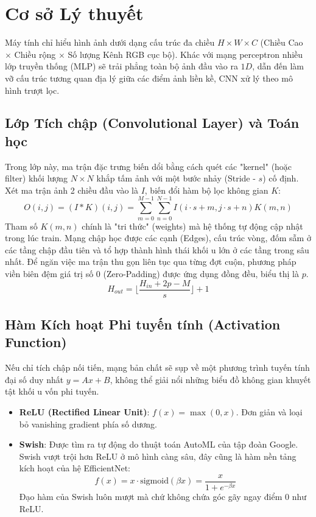 \documentclass[conference,a4paper]{IEEEtran}
\begin{document}
\section{Cơ sở Lý thuyết}
Máy tính chỉ hiểu hình ảnh dưới dạng cấu trúc đa chiều $H \times W \times C$ (Chiều Cao $\times$ Chiều rộng $\times$ Số lượng Kênh RGB cục bộ). Khác với mạng perceptron nhiều lớp truyền thống (MLP) sẽ trải phẳng toàn bộ ảnh đầu vào ra $1D$, dẫn đến làm vỡ cấu trúc tương quan địa lý giữa các điểm ảnh liền kề, CNN xử lý theo mô hình trượt lọc.

\subsection{Lớp Tích chập (Convolutional Layer) và Toán học}
Trong lớp này, ma trận đặc trưng biến dổi bằng cách quét các "kernel" (hoặc filter) khối lượng $N \times N$ khắp tấm ảnh với một bước nhảy (Stride - $s$) cố định.
Xét ma trận ảnh 2 chiều đầu vào là $I$, biến đổi hàm bộ lọc không gian $K$:
\begin{equation}
O(i, j) = (I * K)(i, j) = \sum_{m=0}^{M-1} \sum_{n=0}^{N-1} I(i \cdot s + m, j \cdot s + n) K(m, n)
\end{equation}
Tham số $K(m,n)$ chính là "tri thức" (weights) mà hệ thống tự động cập nhật trong lúc train. Mạng chập học được các cạnh (Edges), cấu trúc vòng, đốm sẫm ở các tầng chập đầu tiên và tổ hợp thành hình thái khối u lớn ở các tầng trong sâu nhất.
Để ngăn việc ma trận thu gọn liên tục qua từng đợt cuộn, phương pháp viền biên đệm giá trị số 0 (Zero-Padding) được ứng dụng đồng đều, biểu thị là $p$.
\begin{equation}
H_{out} = \lfloor \frac{H_{in} + 2p - M}{s} \rfloor + 1
\end{equation}

\subsection{Hàm Kích hoạt Phi tuyến tính (Activation Function)}
Nếu chỉ tích chập nối tiến, mạng bản chất sẽ sụp về một phương trình tuyến tính đại số duy nhất $y = Ax+B$, không thể giải nổi những biểu đồ không gian khuyết tật khối u vốn phi tuyến.
\begin{itemize}
\item \textbf{ReLU (Rectified Linear Unit)}: $f(x) = \max(0, x)$. Đơn giản và loại bỏ vanishing gradient phía số dương.
\item \textbf{Swish}: Được tìm ra tự động do thuật toán AutoML của tập đoàn Google. Swish vượt trội hơn ReLU ở mô hình càng sâu, đây cũng là hàm nền tảng kích hoạt của hệ EfficientNet:
\begin{equation}
f(x) = x \cdot \text{sigmoid}(\beta x) = \frac{x}{1 + e^{-\beta x}}
\end{equation}
Đạo hàm của Swish luôn mượt mà chứ không chứa góc gãy ngay điểm 0 như ReLU.
\end{itemize}
\end{document}
